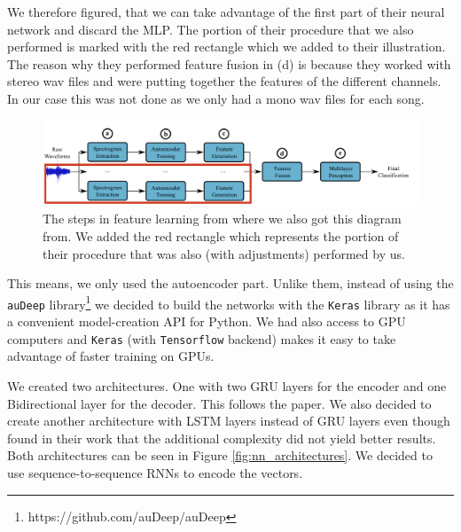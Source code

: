 We therefore figured, that we can take advantage of the first part of their neural network and discard the MLP. The portion of their procedure that we also performed is marked with the red rectangle which we added to their illustration. The reason why they performed feature fusion in (d) is because they worked with stereo wav files and were putting together the features of the different channels. In our case this was not done as we only had a mono wav files for each song.

\begin{figure}[h]
    \centering
	\includegraphics[width=120mm]{./img/inspiration_nn.png}
	\caption{The steps in feature learning from \cite{inproceedings_RNNs} where we also got this diagram from. We added the red rectangle which represents the portion of their procedure that was also (with adjustments) performed by us.}
	\label{fig:inspiration_nn}
\end{figure}

This means, we only used the autoencoder part. Unlike them, instead of using the \texttt{auDeep} library\footnote{https://github.com/auDeep/auDeep} we decided to build the networks with the \texttt{Keras} library \cite{chollet2015keras} as it has a convenient model-creation API for Python. We had also access to GPU computers and \texttt{Keras} (with \texttt{Tensorflow} backend) makes it easy to take advantage of faster training on GPUs. 

We created two architectures. One with two GRU layers for the encoder and one Bidirectional layer for the decoder. This follows the paper. We also decided to create another architecture with LSTM layers instead of GRU layers even though \cite{inproceedings_RNNs} found in their work that the additional complexity did not yield better results. Both architectures can be seen in Figure \ref{fig:nn_architectures}. We decided to use sequence-to-sequence RNNs to encode the vectors.


